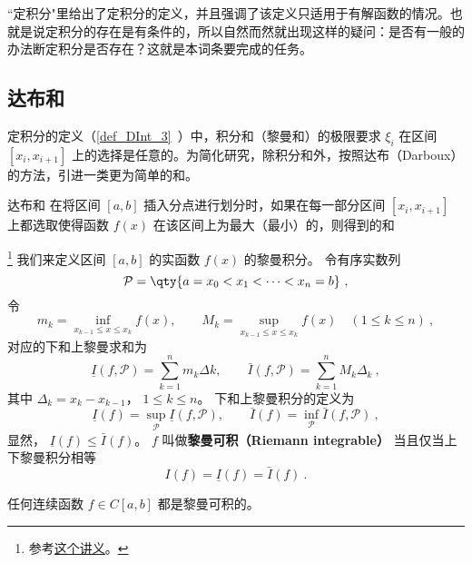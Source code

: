 
“定积分"里给出了定积分的定义，并且强调了该定义只适用于有解函数的情况。也就是说定积分的存在是有条件的，所以自然而然就出现这样的疑问：是否有一般的办法断定积分是否存在？这就是本词条要完成的任务。
\subsection{达布和}
定积分的定义（\autoref{def_DInt_3}~）中，积分和（黎曼和）的极限要求 $\xi_i$ 在区间 $[x_i,x_{i+1}]$ 上的选择是任意的。为简化研究，除积分和外，按照达布（Darboux）的方法，引进一类更为简单的和。
\begin{definition}{达布和}
在将区间 $[a,b]$ 插入分点进行划分时，如果在每一部分区间 $[x_i,x_{i+1}]$ 上都选取使得函数 $f(x)$ 在该区间上为最大（最小）的，则得到的和
\end{definition}

\footnote{参考\href{https://math.berkeley.edu/~arveson/Dvi/105/note1.pdf}{这个讲义}。}
我们来定义区间 $[a, b]$ 的实函数 $f(x)$ 的黎曼积分。 令有序实数列
\begin{equation}
\mathcal P = \qty{a = x_0 < x_1 < \dots < x_n = b}~,
\end{equation}
令
\begin{equation}
m_k = \inf_{x_{k-1} \le x \le x_k} f(x), \qquad M_k = \sup_{x_{k-1} \le x \le x_k} f(x) \quad (1 \le k \le n)~,
\end{equation}
对应的下和上黎曼求和为
\begin{equation}
\underline I(f, \mathcal P) = \sum_{k = 1}^n m_k\Delta k, \qquad \bar I(f, \mathcal P) = \sum_{k = 1}^n M_k \Delta_k~,
\end{equation}
其中 $\Delta_k = x_k - x_{k-1}$， $1\le k\le n$。 下和上黎曼积分的定义为
\begin{equation}
\underline I(f) = \sup_{\mathcal P} \underline I(f, \mathcal P), \qquad \bar I(f) = \inf_{\mathcal P} \bar I(f, \mathcal P)~,
\end{equation}
显然， $\underline I(f) \le \bar I(f)$。 $f$ 叫做\textbf{黎曼可积（Riemann integrable）} 当且仅当上下黎曼积分相等
\begin{equation}
I(f) = \underline I(f) = \bar I(f)~.
\end{equation}

\begin{theorem}{}
任何连续函数 $f \in C[a, b]$ 都是黎曼可积的。
\end{theorem}

